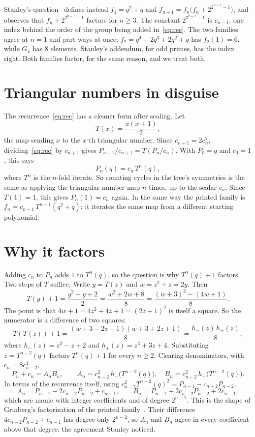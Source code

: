\documentclass[11pt]{article}
\theoremstyle{remark}
\begin{document}
Stanley's question~\cite{MO} defines instead $f_1=q^2+q$ and $f_{n+1}=f_n\bigl(f_n+2^{2^{n-1}-1}\bigr)$, and observes that $f_n+2^{2^{n-1}-1}$ factors for $n\ge3$. The constant $2^{2^{n-1}-1}$ is $c_{n-1}$, one index behind the order of the group being added in~\eqref{eq:rec}. The two families agree at $n=1$ and part ways at once: $f_2=q^4+2q^3+2q^2+q$ has $f_2(1)=6$, while $G_4$ has $8$ elements. Stanley's addendum, for odd primes, has the index right. Both families factor, for the same reason, and we treat both.

\section{Triangular numbers in disguise}\label{sec:tri}

The recurrence~\eqref{eq:rec} has a cleaner form after scaling. Let
\[
T(x)=\frac{x(x+1)}2,
\]
the map sending $x$ to the $x$-th triangular number. Since $c_{n+1}=2c_n^2$, dividing~\eqref{eq:rec} by $c_{n+1}$ gives $P_{n+1}/c_{n+1}=T(P_n/c_n)$. With $P_0=q$ and $c_0=1$, this says
\[
P_n(q)=c_n\,T^{n}(q),
\]
where $T^n$ is the $n$-fold iterate. So counting cycles in the tree's symmetries is the same as applying the triangular-number map $n$ times, up to the scalar $c_n$. Since $T(1)=1$, this gives $P_n(1)=c_n$ again. In the same way the printed family is $f_n=c_{n-1}\,T^{n-1}(q^2+q)$: it iterates the same map from a different starting polynomial.

\section{Why it factors}

Adding $c_n$ to $P_n$ adds $1$ to $T^n(q)$, so the question is why $T^n(q)+1$ factors. Two steps of $T$ suffice. Write $y=T(z)$ and $w=z^2+z=2y$. Then
\[
T(y)+1=\frac{y^2+y+2}{2}=\frac{w^2+2w+8}{8}=\frac{(w+3)^2-(4w+1)}{8}.
\]
The point is that $4w+1=4z^2+4z+1=(2z+1)^2$ is itself a square. So the numerator is a difference of two squares:
\begin{equation}\label{eq:two}
T(T(z))+1=\frac{(w+3-2z-1)(w+3+2z+1)}{8}=\frac{h_-(z)\,h_+(z)}{8},
\end{equation}
where $h_-(z)=z^2-z+2$ and $h_+(z)=z^2+3z+4$.
Substituting $z=T^{n-2}(q)$ factors $T^n(q)+1$ for every $n\ge2$. Clearing denominators, with $c_n=8c_{n-2}^4$,
\[
P_n+c_n=A_nB_n,\qquad A_n=c_{n-2}^2\,h_-\bigl(T^{n-2}(q)\bigr),\quad B_n=c_{n-2}^2\,h_+\bigl(T^{n-2}(q)\bigr).
\]
In terms of the recurrence itself, using $c_{n-2}^2T^{n-2}(q)^2=P_{n-1}-c_{n-2}P_{n-2}$,
\[
A_n=P_{n-1}-2c_{n-2}P_{n-2}+c_{n-1},\qquad B_n=P_{n-1}+2c_{n-2}P_{n-2}+2c_{n-1},
\]
which are monic with integer coefficients and of degree $2^{n-1}$. This is the shape of Grinberg's factorization of the printed family~\cite{Grinberg}. Their difference $4c_{n-2}P_{n-2}+c_{n-1}$ has degree only $2^{n-2}$, so $A_n$ and $B_n$ agree in every coefficient above that degree: the agreement Stanley noticed.
\end{document}
